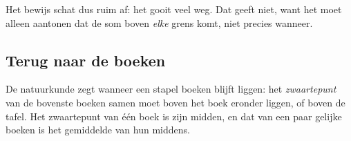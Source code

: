 Het bewijs schat dus ruim af: het gooit veel weg. Dat geeft niet, want het moet alleen aantonen dat de som boven \textit{elke} grens komt, niet precies wanneer.

\begin{oefeningen}
\end{oefeningen}

\subsection{Terug naar de boeken}

De natuurkunde zegt wanneer een stapel boeken blijft liggen: het \textit{zwaartepunt} van de bovenste boeken samen moet boven het boek eronder liggen, of boven de tafel. Het zwaartepunt van één boek is zijn midden, en dat van een paar gelijke boeken is het gemiddelde van hun middens.


